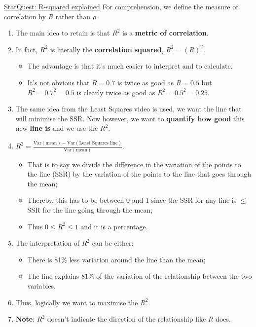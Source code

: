 \documentclass[12pt, titlepage, french]{report}
\begin{document}
\begin{YTB_SUMM}{\href{https://www.youtube.com/watch?v=2AQKmw14mHM&list=PLblh5JKOoLUIzaEkCLIUxQFjPIlapw8nU&index=10}{StatQuest: R-squared explained}}
For comprehension, we define the measure of correlation by $R$ rather than $\rho$.
\begin{enumerate}
	\item	The main idea to retain is that $R^{2}$ is a \textbf{metric of correlation}.
	\item	In fact, $R^{2}$ is literally the \textbf{correlation squared},  $R^{2} = (R)^{2}$.
	\begin{itemize}
		\item	The advantage is that it's much easier to interpret and to calculate.
		\item	It's not obvious that $R = 0.7$ is twice as good as $R = 0.5$ but $R^{2} = 0.7^{2} = 0.5$ is clearly twice as good as $R^{2} = 0.5^{2} = 0.25$.
	\end{itemize}
	\item	The same idea from the Least Squares video is used, we want the line that will minimise the SSR. Now however, we want to \textbf{quantify how good} this new \textbf{line is} and we use the $R^{2}$.
	\item	$R^{2} = \frac{\text{Var}(\text{mean}) - \text{Var}(\text{Least Squares line})}{\text{Var}(\text{mean})}$. 
	\begin{itemize}
		\item	That is to say we divide the difference in the variation of the points to the line (SSR) by the variation of the points to the line that goes through the mean;
		\item	Thereby, this has to be between 0 and 1 since the SSR for any line is $\le$ SSR for the line going through the mean;
		\item	Thus $0 \le R^{2} \le 1$ and it is a percentage.
	\end{itemize}
	\item	The interpretation of $R^{2}$ can be either:
	\begin{itemize}
		\item	There is 81\% less variation around the line than the mean;
		\item	The line explains 81\% of the variation of the relationship between the two variables.
	\end{itemize}
	\item	Thus, logically we want to maximise the $R^{2}$.
	\item	\textbf{Note}: $R^{2}$ doesn't indicate the direction of the relationship like $R$ does.
\end{enumerate}
\end{YTB_SUMM}
\end{document}
